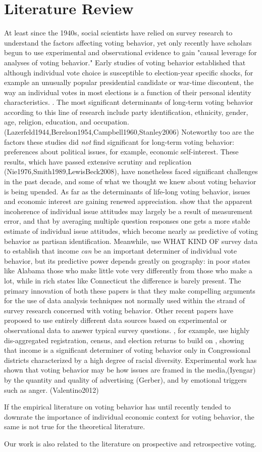 \section{Literature Review}

At least since the 1940s, social scientists have relied on survey research to understand the factors affecting voting behavior, yet only recently have scholars begun to use experimental and observational evidence to gain "causal leverage for analyses of voting behavior." \cite{bartels_larry_m._study_2010} Early studies of voting behavior established that although individual vote choice is susceptible to election-year specific shocks, for example an unusually  popular presidential candidate or war-time discontent, the way an individual votes in most elections is a function of their personal identity characteristics. \cite{ConverseNormalVote}. The most significant determinants of long-term voting behavior according to this line of research include party identification, ethnicity, gender, age, religion, education, and occupation. (Lazerfeld1944,Berelson1954,Campbell1960,Stanley2006) Noteworthy too are the factors these studies did \textit{not} find significant for long-term voting behavior: preferences about political issues, for example, economic self-interest. These results, which have passed extensive scrutiny and replication (Nie1976,Smith1989,LewisBeck2008), have nonetheless faced significant challenges in the past decade, and some of what we thought we knew about voting behavior is being upended. As far as the determinants of life-long voting behavior, issues and economic interest are gaining renewed appreciation. \cite{Ansolabehere_Snyder_Rodden} show that the apparent incoherence of individual issue attitudes may largely be a result of measurement error, and that by averaging multiple question responses one gets a more stable estimate of individual issue attitudes, which become nearly as predictive of voting behavior as partisan identification. Meanwhile, \cite{Gelman2009} use WHAT KIND OF survey data to establish that income \textit{can} be an important determiner of individual vote behavior, but its predictive power depends greatly on geography: in poor states like Alabama those who make little vote very differently from those who make a lot, while in rich states like Connecticut the difference is barely present. The primary innovation of both these papers is that they make compelling arguments for the use of data analysis techniques not normally used within the strand of survey research concerned with voting behavior. Other recent papers have proposed to use entirely different data sources based on experimental or observational data to answer typical survey questions. \cite{Hersh2015}, for example, use highly dis-aggregated registration, census, and election returns to build on \cite{Gelman2009}, showing that income is a significant determiner of voting behavior only in Congressional districts characterized by a high degree of racial diversity.  Experimental work has shown that voting behavior may be how issues are framed in the media,(Iyengar) by the quantity and quality of advertising (Gerber), and by emotional triggers such as anger. (Valentino2012)

If the empirical literature on voting behavior has until recently tended to downrate the importance of individual economic context for voting behavior, the same is not true for the theoretical literature.

Our work is also related to the literature on prospective and retrospective voting.